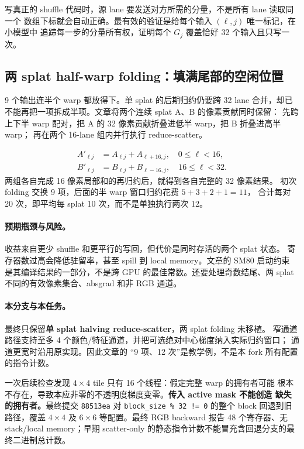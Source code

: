 写真正的 shuffle 代码时，源 lane 要发送对方所需的分量，不是所有 lane 读取同一个
数组下标就会自动正确。最有效的验证是给每个输入 $(\ell,j)$ 唯一标记，在小模型中
追踪每一步的分量所有权，证明每个 $G_j$ 覆盖恰好 32 个输入且只写一次。

\subsection{两 splat half-warp folding：填满尾部的空闲位置}

9 个输出连半个 warp 都放得下。单 splat 的后期归约仍要跨 32 lane 合并，却已
不能再把一项拆成半项。文章将两个连续 splat A、B 的像素贡献同时保留：
先跨上下半 warp 配对，把 A 的 32 像素贡献折叠进低半 warp，把 B 折叠进高半 warp；
再在两个 16-lane 组内并行执行 reduce-scatter。

\begin{align}
 A'_{\ell j}&=A_{\ell j}+A_{\ell+16,j},\quad 0\leq\ell<16,\\
 B'_{\ell j}&=B_{\ell j}+B_{\ell-16,j},\quad16\leq\ell<32.
\end{align}
两组各自完成 16 像素局部和的再归约后，就得到各自完整的 32 像素结果。
初次 folding 交换 9 项，后面的半 warp 窗口归约花费 $5+3+2+1=11$，
合计每对 20 次，即平均每 splat 10 次，而不是单独执行两次 12。

\paragraph{预期瓶颈与风险。}
收益来自更少 shuffle 和更平行的写回，但代价是同时存活的两个 splat 状态。
寄存器数过高会降低驻留率，甚至 spill 到 local memory。文章的 SM80 启动约束
是其编译结果的一部分，不是跨 GPU 的最佳常数。还要处理奇数结尾、两 splat
不同的有效像素集合、absgrad 和非 RGB 通道。

\paragraph{本分支与本任务。}
最终只保留\textbf{单 splat halving reduce-scatter}，两 splat folding 未移植。
窄通道路径支持至多 4 个颜色/特征通道，并把可选绝对中心梯度纳入实际归约窗口；
通道更宽时沿用原实现。因此文章的 ``9 项、12 次''是教学例，不是本 fork 所有配置
的指令计数。

一次后续检查发现 $4\times4$ tile 只有 16 个线程：假定完整 warp 的拥有者可能
根本不存在，导致本应非零的不透明度梯度变零。\textbf{传入 active mask 不能创造
缺失的拥有者。}最终提交 \texttt{88513ea} 对
\texttt{block\_size \% 32 != 0} 的整个 block 回退到旧路径，覆盖 $4\times4$
及 $6\times6$ 等配置。最终 RGB backward 报告 48 个寄存器、无 stack/local
memory；早期 scatter-only 的静态指令计数不能冒充含回退分支的最终二进制总计数。


